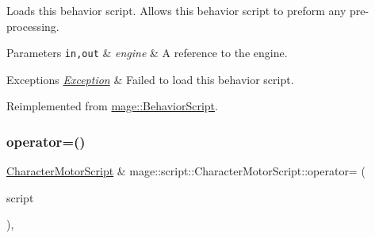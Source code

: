 Loads this behavior script. Allows this behavior script to preform any pre-\/processing.


\begin{DoxyParams}[1]{Parameters}
\mbox{\tt in,out}  & {\em engine} & A reference to the engine. \\
\hline
\end{DoxyParams}

\begin{DoxyExceptions}{Exceptions}
{\em \mbox{\hyperlink{classmage_1_1_exception}{Exception}}} & Failed to load this behavior script. \\
\hline
\end{DoxyExceptions}


Reimplemented from \mbox{\hyperlink{classmage_1_1_behavior_script_ae7864876b2ffb1d1d8d8a56e3099f1f2}{mage\+::\+Behavior\+Script}}.

\mbox{\label{classmage_1_1script_1_1_character_motor_script_aec26db7e08e315cf2461e860b1eaee4e}} 
\subsubsection{\texorpdfstring{operator=()}{operator=()}\hspace{0.1cm}{\footnotesize\ttfamily [1/2]}}
{\footnotesize\ttfamily \mbox{\hyperlink{classmage_1_1script_1_1_character_motor_script}{Character\+Motor\+Script}} \& mage\+::script\+::\+Character\+Motor\+Script\+::operator= (\begin{DoxyParamCaption}\item[{const \mbox{\hyperlink{classmage_1_1script_1_1_character_motor_script}{Character\+Motor\+Script}} \&}]{script }\end{DoxyParamCaption})\hspace{0.3cm}{\ttfamily [default]}, {\ttfamily [noexcept]}}

\mbox{\label{classmage_1_1script_1_1_character_motor_script_a284b9ecfd595278062cf3a16ebd90f43}} 
